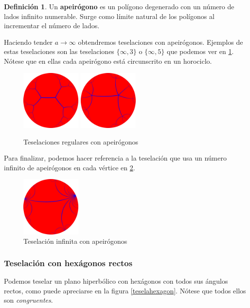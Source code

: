 \documentclass{article}
\theoremstyle{plain}
\theoremstyle{definition}
\newtheorem{definition}{Definición}
\theoremstyle{remark}
\begin{document}
\begin{definition}
  Un \textbf{apeirógono} es un polígono degenerado con un número de
  lados infinito numerable. Surge como límite natural de los polígonos
  al incrementar el número de lados.
\end{definition}

Haciendo tender $a \to \infty$ obtendremos teselaciones con apeirógonos.
Ejemplos de estas teselaciones son las teselaciones $\{\infty,3\}$ o
$\{\infty,5\}$ que podemos ver en \ref{tiling3}. Nótese que en ellas
cada apeirógono está circunscrito en un horociclo.

\begin{figure}[ht!]
  \centering
  \includegraphics[width=30mm]{./tiling-i-3.png}
  \includegraphics[width=30mm]{./tiling-i-5.png}
  \caption{Teselaciones regulares con apeirógonos \label{tiling3}}
\end{figure}

Para finalizar, podemos hacer referencia a la teselación que usa un
número infinito de apeirógonos en cada vértice en \ref{tiling4}.

\begin{figure}[ht!]
  \centering
  \includegraphics[width=30mm]{./tiling-i-i.png}
  \caption{Teselación infinita con apeirógonos \label{tiling4}}
\end{figure}

\subsubsection{Teselación con hexágonos rectos}
Podemos teselar un plano hiperbólico con hexágonos con todos sus ángulos rectos,
como puede apreciarse en la figura \ref{teselahexagon}.
Nótese que todos ellos son \textit{congruentes}.
\end{document}
